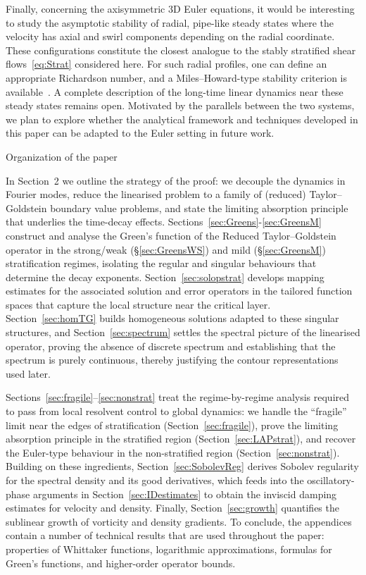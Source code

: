 \documentclass[11pt,reqno]{amsproc}
\makeatletter
\renewcommand\subsection{\@startsection{subsection}{2}%
\normalparindent{.5\linespacing\@plus.7\linespacing}{-.5em}
{\normalfont\bfseries}}
\theoremstyle{definition}
\numberwithin{equation}{section}
\makeatother
\begin{document}
Finally, concerning the axisymmetric 3D Euler equations, it would be interesting to study the asymptotic stability of radial, pipe-like steady states where the velocity has axial and swirl components depending on the radial coordinate. These configurations constitute the closest analogue to the stably stratified shear flows~\eqref{eq:Strat} considered here. For such radial profiles, one can define an appropriate Richardson number, and a Miles–Howard-type stability criterion is available~\cite{howard1962hydrodynamic}. A complete description of the long-time linear dynamics near these steady states remains open. Motivated by the parallels between the two systems, we plan to explore whether the analytical framework and techniques developed in this paper can be adapted to the Euler setting in future work.



\subsection{Organization of the paper}

In Section~2 we outline the strategy of the proof: we decouple the dynamics in Fourier modes, reduce the linearised problem to a family of (reduced) Taylor–Goldstein boundary value problems, and state the limiting absorption principle that underlies the time-decay effects. Sections~\ref{sec:Greens}-\ref{sec:GreensM} construct and analyse the Green’s function of the Reduced Taylor--Goldstein operator in the strong/weak (\S\ref{sec:GreensWS}) and mild (\S\ref{sec:GreensM}) stratification regimes, isolating the regular and singular behaviours that determine the decay exponents. Section~\ref{sec:solopstrat} develops mapping estimates for the associated solution and error operators in the tailored function spaces that capture the local structure near the critical layer. Section~\ref{sec:homTG} builds homogeneous solutions adapted to these singular structures, and Section~\ref{sec:spectrum} settles the spectral picture of the linearised operator, proving the absence of discrete spectrum and establishing that the spectrum is purely continuous, thereby justifying the contour representations used later.

Sections~\ref{sec:fragile}–\ref{sec:nonstrat} treat the regime-by-regime analysis required to pass from local resolvent control to global dynamics: we handle the ``fragile'' limit near the edges of stratification (Section~\ref{sec:fragile}), prove the limiting absorption principle in the stratified region (Section~\ref{sec:LAPstrat}), and recover the Euler-type behaviour in the non-stratified region (Section~\ref{sec:nonstrat}). Building on these ingredients, Section~\ref{sec:SobolevReg} derives Sobolev regularity for the spectral density and its good derivatives, which feeds into the oscillatory-phase arguments in Section~\ref{sec:IDestimates} to obtain the inviscid damping estimates for velocity and density. Finally, Section~\ref{sec:growth} quantifies the sublinear growth of vorticity and density gradients. To conclude, the appendices contain a number of technical results that are used throughout the paper: properties of Whittaker functions, logarithmic approximations, formulas for Green's functions, and higher-order operator bounds.
\end{document}
